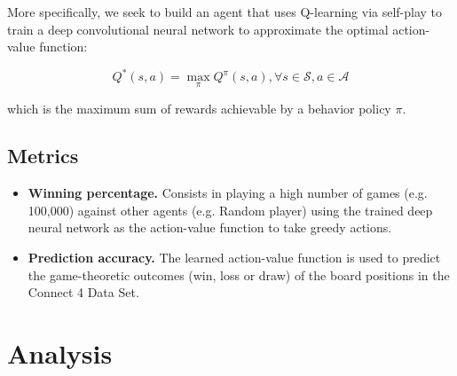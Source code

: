 \documentclass{article}
\begin{document}
More specifically, we seek to build an agent that uses Q-learning via self-play to train a deep
convolutional neural network to approximate the optimal action-value function:

\begin{equation}
Q^*(s,a) = \max\limits_\pi Q^\pi(s,a), \forall s \in \mathcal{S}, a \in \mathcal{A}
\end{equation}

\noindent which is the maximum sum of rewards achievable by a behavior policy $\pi$.

\subsection{Metrics}

\begin{itemize}

    \item \textbf{Winning percentage.} Consists in playing a high number of games (e.g. 100,000)
        against other agents (e.g. Random player) using the trained deep neural network as the
        action-value function to take greedy actions.
        
    \item \textbf{Prediction accuracy.} The learned action-value function is used to predict the
        game-theoretic outcomes (win, loss or draw) of the board positions in the Connect 4 Data
        Set.

\end{itemize}




\section{Analysis}
\end{document}
